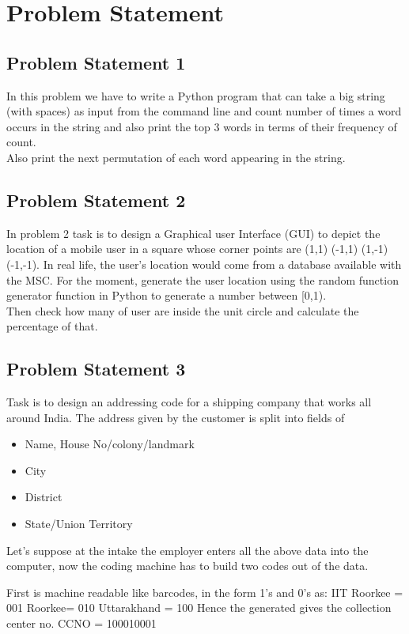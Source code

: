 \documentclass{article}
\begin{document}
\section{Problem Statement}
\subsection{Problem Statement 1}
In this problem we have to write a Python program that can take a big string (with spaces) as input from the command line and count number of times a word occurs in the string and also print the top 3 words in terms of their frequency of count.\\
Also print the next permutation of each word appearing in the string.\\

\subsection{Problem Statement 2}
In problem 2 task is to  design a Graphical user Interface (GUI) to depict the location of a mobile user in a square whose corner points are (1,1) (-1,1) (1,-1)(-1,-1). In real life, the user’s location would come from a database available with the MSC. For the moment, generate the user location using the random function generator function in Python to generate a number between [0,1).\\
Then check how many of user are inside the unit circle and calculate the percentage of that.

\subsection{Problem Statement 3}
Task is to design an addressing code for a shipping company that works all around India. The address given by the customer is split into fields of 
\begin{itemize}

\item Name, House No/colony/landmark
\item City
\item District
\item State/Union Territory

\end{itemize}

Let's suppose at the intake the employer enters all the above data into the computer, now the coding machine has to build two codes out of the data.

First is machine readable like barcodes, in the form 1’s and 0’s as:
IIT Roorkee  = 001
Roorkee= 010
Uttarakhand = 100
Hence the generated gives the collection center no. CCNO = 100010001
\end{document}
